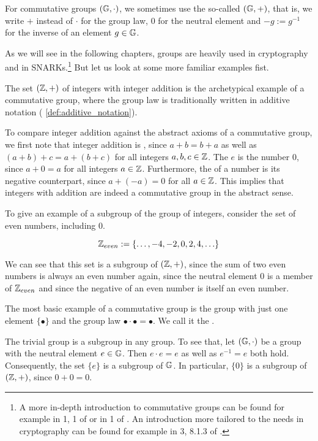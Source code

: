 \begin{notation}\label{def:additive_notation}
For commutative groups $(\mathbb{G},\cdot)$, we sometimes use the so-called  $(\mathbb{G},+)$, that is, we write $+$ instead of $\cdot$ for the group law, $0$ for the neutral element and $-g:=g^{-1}$ for the inverse of an element $g\in\mathbb{G}$.
\end{notation}
As we will see in the following chapters, groups are heavily used in cryptography and in SNARKs.\footnote{A more in-depth introduction to commutative groups can be found for example in \chaptname{} 1, \secname{} 1 of \cite{nieder-1986} or in \chaptname{} 1 of \cite{fuchs-2015}. An introduction more tailored to the needs in cryptography can be found for example in \chaptname{} 3, \secname{} 8.1.3 of \cite{katz-2007}.} But let us look at some more familiar examples fist.

\begin{example}
\label{example:group_of_integers}
The set $(\mathbb{Z},+)$ of integers with integer addition is the archetypical example of a commutative group, where the group law is traditionally written in additive notation (\notationname{} \ref{def:additive_notation}). 

To compare integer addition against the abstract axioms of a commutative group, we first note that integer addition is , since $a+b = b+a$ as well as $(a+b)+c=a+(b+c)$ for all integers $a,b,c\in \mathbb{Z}$. The  $e$ is the number $0$, since $a+0=a$ for all integers $a\in \mathbb{Z}$. Furthermore, the  of a number is its negative counterpart, since $a+(-a)=0$ for all $a\in\mathbb{Z}$. This implies that integers with addition are indeed a commutative group in the abstract sense.

To give an example of a subgroup of the group of integers, consider the set of even numbers, including $0$. 

$$\mathbb{Z}_{even}:=\{\ldots,-4,-2,0,2,4,\ldots\}$$

We can see that this set is a subgroup of $(\mathbb{Z},+)$, since the sum of two even numbers is always an even number again, since the neutral element $0$ is a member of $\mathbb{Z}_{even}$ and since the negative of an even number is itself an even number. 
\end{example}
\begin{example}\label{example:trivial_group}
The most basic example of a commutative group is the group with just one element $\{\bullet\}$ and the group law $\bullet\cdot \bullet=\bullet$. We call it the .

The trivial group is a subgroup in any group. To see that, let $(\mathbb{G},\cdot)$ be a group with the neutral element $e\in\mathbb{G}$. Then $e\cdot e = e$ as well as $e^{-1}=e$ both hold. Consequently, the set $\{e\}$ is a subgroup of $\mathbb{G}$. In particular, $\{0\}$ is a subgroup of $(\mathbb{Z},+)$, since $0+0=0$.
\end{example}

